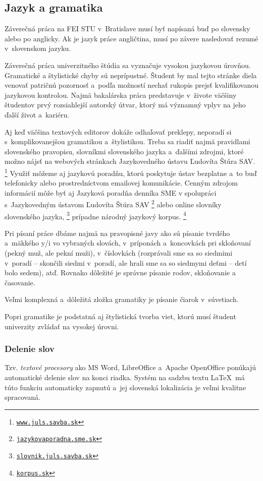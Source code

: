 \documentclass[../../../thesis.tex]{subfiles}
\begin{document}
\subsection{Jazyk a gramatika}
Záverečná práca na FEI STU v~Bratislave musí byť napísaná
buď po slovensky alebo po anglicky.
Ak je jazyk práce angličtina, musí po závere nasledovať
rezumé v~slovenskom jazyku.

Záverečná práca univerzitného štúdia sa vyznačuje
vysokou jazykovou úrovňou.
Gramatické a štylistické chyby sú neprípustné.
Študent by mal tejto stránke diela venovať patričnú
pozornosť a~podľa možností nechať rukopis prejsť
kvalifikovanou jazykovou kontrolou.
Najmä bakalárska práca predstavuje v~živote väčšiny študentov
prvý rozsiahlejší autorský útvar,
ktorý má významný vplyv na jeho ďalší život a~kariéru.

Aj keď väčšina textových editorov dokáže odhaľovať preklepy,
neporadí si s~komplikovanejšou gramatikou a~štylistikou.
Treba sa riadiť najmä pravidlami slovenského pravopisu,
slovníkmi slovenského jazyka a~ďalšími zdrojmi,
ktoré možno nájsť na webových stránkach
Jazykovedného ústavu Ľudovíta Štúra SAV.%
\footnote{\href{https://www.juls.savba.sk/}{\tt www.juls.savba.sk}}
Využiť môžeme aj jazykovú poradňu,
ktorú poskytuje ústav bezplatne a~to buď telefonicky alebo
prostredníctvom emailovej komunikácie.
Cenným zdrojom informácií môže byť aj Jazyková poradňa
denníka SME v spolupráci
s~Jazykovedným ústavom Ľudovíta Štúra SAV%
\footnote{\href{https://jazykovaporadna.sme.sk/}{\tt jazykovaporadna.sme.sk}}
alebo online slovníky slovenského jazyka,%
\footnote{\href{https://slovnik.juls.savba.sk/}{\tt slovnik.juls.savba.sk}}
prípadne národný jazykový korpus.%
\footnote{\href{https://korpus.sk/}{\tt korpus.sk}}

Pri písaní práce dbáme najmä na pravopisné javy ako sú písanie
tvrdého a~mäkkého y/i vo vybraných slovách,
v~príponách a~koncovkách pri skloňovaní
(pekný muž, ale pekní muži),
v~číslovkách (rozprávali sme sa so siedmimi v~poradí
-- skončili siedmi v~poradí,
ale hrali sme sa so siedmymi deťmi -- detí bolo sedem), atď.
Rovnako dôležité je správne písanie rodov,
skloňovanie a časovanie.

Veľmi komplexná a~dôležitá zložka gramatiky
je písanie čiarok v~súvetiach.

Popri gramatike je podstatná aj štylistická tvorba viet,
ktorú musí študent univerzity zvládať na vysokej úrovni.

\subsubsection{Delenie slov}
Tzv. \emph{textové procesory} ako MS Word, LibreOffice a~Apache OpenOffice
ponúkajú automatické delenie slov na konci riadka.
Systém na sadzbu textu \LaTeX\ má túto funkciu automaticky zapnutú a~jej slovenská lokalizácia je veľmi kvalitne spracovaná.
\end{document}
